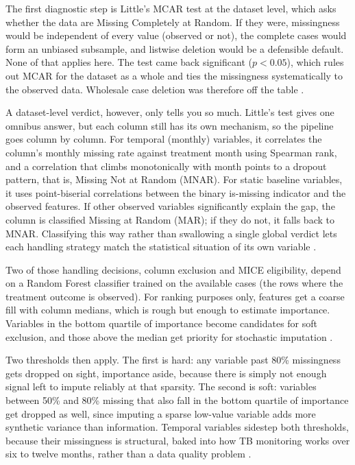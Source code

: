 \documentclass[12pt]{article}
\renewcommand{\_}{\textunderscore\allowbreak}
\begin{document}
\FloatBarrier

The first diagnostic step is Little's MCAR test at the dataset level, which asks whether the data are Missing Completely at Random. If they were, missingness would be independent of every value (observed or not), the complete cases would form an unbiased subsample, and listwise deletion would be a defensible default. None of that applies here. The test came back significant ($p < 0.05$), which rules out MCAR for the dataset as a whole and ties the missingness systematically to the observed data. Wholesale case deletion was therefore off the table \citep{ref32}.

A dataset-level verdict, however, only tells you so much. Little's test gives one omnibus answer, but each column still has its own mechanism, so the pipeline goes column by column. For temporal (monthly) variables, it correlates the column's monthly missing rate against treatment month using Spearman rank, and a correlation that climbs monotonically with month points to a dropout pattern, that is, Missing Not at Random (MNAR). For static baseline variables, it uses point-biserial correlations between the binary is-missing indicator and the observed features. If other observed variables significantly explain the gap, the column is classified Missing at Random (MAR); if they do not, it falls back to MNAR. Classifying this way rather than swallowing a single global verdict lets each handling strategy match the statistical situation of its own variable \citep{ref31, ref32}.

Two of those handling decisions, column exclusion and MICE eligibility, depend on a Random Forest classifier trained on the available cases (the rows where the treatment outcome is observed). For ranking purposes only, features get a coarse fill with column medians, which is rough but enough to estimate importance. Variables in the bottom quartile of importance become candidates for soft exclusion, and those above the median get priority for stochastic imputation \citep{ref35}.

Two thresholds then apply. The first is hard: any variable past 80\% missingness gets dropped on sight, importance aside, because there is simply not enough signal left to impute reliably at that sparsity. The second is soft: variables between 50\% and 80\% missing that also fall in the bottom quartile of importance get dropped as well, since imputing a sparse low-value variable adds more synthetic variance than information. Temporal variables sidestep both thresholds, because their missingness is structural, baked into how TB monitoring works over six to twelve months, rather than a data quality problem \citep{ref37}.
\end{document}
